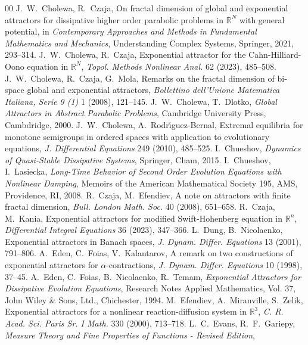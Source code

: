 \documentclass[a4paper,12pt,reqno]{amsart}
\theoremstyle{plain}
\theoremstyle{definition}
\numberwithin{equation}{section}
\newcommand{\R}{\mathbb{R}}
\begin{document}
\begin{thebibliography}{00}
J.~W.~Cholewa, R.~Czaja,
On fractal dimension of global and exponential attractors for dissipative higher order parabolic problems in $\R^N$ with general potential, in \textit{Contemporary Approaches and Methods in Fundamental Mathematics and Mechanics}, Understanding Complex Systems, Springer, 2021, 293--314. 
%
J.~W.~Cholewa, R.~Czaja,
Exponential attractor for the Cahn-Hilliard-Oono equation in $\R^N$, 
\textit{Topol. Methods Nonlinear Anal.} 62 (2023), 485--508.
%
J.~W.~Cholewa, R.~Czaja, G.~Mola,
Remarks on the fractal dimension of bi-space global and exponential attractors,
\textit{Bollettino dell’Unione Matematica Italiana, Serie 9 (1)}
1 (2008), 121--145.
%
J.~W.~Cholewa, T.~Dlotko,
\textit{Global Attractors in Abstract Parabolic Problems},
Cambridge University Press, Cambdridge, 2000.
%
J.~W.~Cholewa, A.~Rodr\'{\i}guez-Bernal,
Extremal equilibria for monotone semigroups in ordered spaces with application to evolutionary equations,
\textit{J. Differential Equations} 249 (2010), 485--525.
%
I.~Chueshov,
\textit{Dynamics of Quasi-Stable Dissipative Systems},
Springer, Cham, 2015.
%
I.~Chueshov, I.~Lasiecka,
\textit{Long-Time Behavior of Second Order Evolution Equations with Nonlinear Damping},
Memoirs of the American Mathematical Society 195, AMS, Providence, RI, 2008.
%
R.~Czaja, M.~Efendiev,	
A note on attractors with finite fractal dimension,	
\textit{Bull. London Math. Soc.} 40 (2008), 651--658.
%
R.~Czaja, M.~Kania,
Exponential attractors for modified Swift-Hohenberg equation in $\R^n$,
\textit{Differential Integral Equations} 36 (2023), 347--366.
%
L.~Dung, B.~Nicolaenko,
Exponential attractors in Banach spaces,
\textit{J. Dynam. Differ. Equations} 13 (2001), 791--806.
%
A.~Eden, C.~Foias, V.~Kalantarov,
A remark on two constructions of exponential attractors for $\alpha$-contractions,
\textit{J. Dynam. Differ. Equations} 10 (1998), 37--45.
%
A.~Eden, C.~Foias, B.~Nicolaenko, R.~Temam,
\textit{Exponential Attractors for Dissipative Evolution Equations},
Research Notes Applied Mathematics, Vol. 37, John Wiley \& Sons, Ltd., Chichester, 1994.
%
M.~Efendiev, A.~Miranville, S.~Zelik, 
Exponential attractors for a nonlinear reaction-diffusion system in $\R^3$, 
\textit{C. R. Acad. Sci. Paris Sr. I Math.} 330 (2000), 713--718.
%
L.~C.~Evans, R.~F.~Gariepy,
\textit{Measure Theory and Fine Properties of Functions - Revised Edition},

\end{thebibliography}
\end{document}
